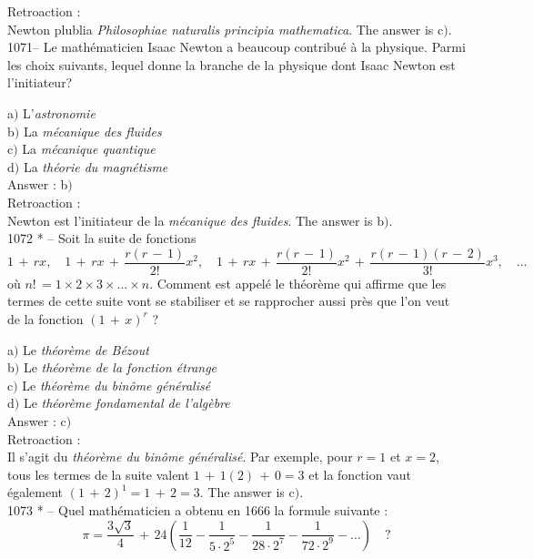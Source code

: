 ﻿\documentclass[letterpaper, 12pt]{article}
\begin{document}
Retroaction : \\
Newton plublia {\sl Philosophiae naturalis principia mathematica}.
The answer is c$)$.\\

1071-- Le math\'ematicien Isaac Newton a beaucoup contribu\'e \`a la
physique. Parmi les choix suivants, lequel donne la branche de la
physique dont Isaac Newton est l'initiateur?

a$)$ L'{\sl astronomie} \\
b$)$ La {\sl m\'ecanique des fluides}  \\
c$)$ La {\sl m\'ecanique quantique}  \\
d$)$ La {\sl th\'eorie du magn\'etisme}\\

Answer : b$)$\\

Retroaction : \\
Newton est l'initiateur de la {\sl m\'ecanique des fluides}.
The answer is b$)$.\\

1072 * -- Soit la suite de fonctions
$$\displaystyle{1\,+\,rx,\quad 1\,+\,rx\,+\,\frac{r(r\,-\,1)}{2!}x^2,\quad
1\,+\,rx\,+\,\frac{r(r\,-\,1)}{2!}x^2\,+\,\frac{r(r\,-\,1)(r\,-\,2)}{3!}x^3,\quad
\ldots}$$
o\`u $n!\,=1\times2\times3\times\ldots\times n$. Comment est
appel\'e le th\'eor\`eme qui affirme que les termes de cette suite
vont se stabiliser et se rapprocher aussi pr\`es que l'on veut de la
fonction $(1\,+\,x)^r$ ?

a$)$ Le {\sl th\'eor\`eme de B\'ezout} \\
b$)$ Le {\sl th\'eor\`eme de la fonction \'etrange}  \\
c$)$ Le {\sl th\'eor\`eme du bin\^ome g\'en\'eralis\'e}  \\
d$)$ Le {\sl th\'eor\`eme fondamental de l'alg\`ebre}\\

Answer : c$)$\\

Retroaction : \\
Il s'agit du {\sl th\'eor\`eme du bin\^ome g\'en\'eralis\'e}. Par
exemple, pour $r=1$ et $x=2$, tous les termes de la suite valent
$1\,+\,1(2)\,+\,0=3$ et la fonction vaut \'egalement
$(1\,+\,2)^1=1\,+\,2=3$.
The answer is c$)$.\\

1073 * -- Quel math\'ematicien a obtenu en 1666 la formule suivante
:
$$\displaystyle{\pi=\frac{3\sqrt3}4\,+\,24\left(\frac1{12}-\frac1{5\cdot2^5}-\frac1{28\cdot2^7}-\frac1{72\cdot2^9}-\ldots\right)}\quad?$$
\end{document}
